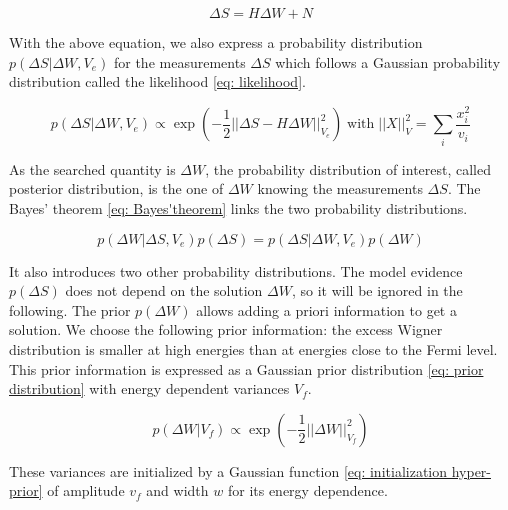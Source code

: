 \begin{equation}
\Delta S = H\Delta W + N \label{eq: matrix product for convolution}
\end{equation}

With the above equation, we also express a probability distribution $p\left(\Delta S \left|\right. \Delta W, V_{e} \right)$ for the measurements $\Delta S$ which follows a Gaussian probability distribution called the likelihood \eqref{eq: likelihood}.

\begin{equation}
p\left(\Delta S \left|\right. \Delta W, V_{e}  \right) \propto \exp\left(-\frac{1}{2}\left||\Delta S - H\Delta W\right||^{2}_{V_{e}}\right)\;\mathrm{with}\;\left||X\right||^{2}_{V} = \sum_{i}^{}\frac{x^{2}_{i}}{v_{i}} \label{eq: likelihood}
\end{equation}

As the searched quantity is $\Delta W$, the probability distribution of interest, called posterior distribution, is the one of $\Delta W$ knowing the measurements $\Delta S$.
The Bayes' theorem \eqref{eq: Bayes'theorem} links the two probability distributions.

\begin{equation}
p\left(\Delta W \left|\right. \Delta S, V_{e} \right) p\left(\Delta S\right) = p\left(\Delta S \left|\right. \Delta W, V_{e}  \right) p\left( \Delta W \right) \label{eq: Bayes'theorem}
\end{equation}

It also introduces two other probability distributions.
The model evidence $p\left(\Delta S\right)$ does not depend on the solution $\Delta W$, so it will be ignored in the following.
The prior $p\left( \Delta W \right)$ allows adding a priori information to get a solution.
We choose the following prior information: the excess Wigner distribution is smaller at high energies than at energies close to the Fermi level.
This prior information is expressed as a Gaussian prior distribution \eqref{eq: prior distribution} with energy dependent variances $V_{f}$.

\begin{equation}
p\left( \Delta W \left|\right. V_{f} \right) \propto \exp\left(-\frac{1}{2}\left||\Delta W\right||^{2}_{V_{f}}\right) \label{eq: prior distribution}
\end{equation}

These variances are initialized by a Gaussian function \eqref{eq: initialization hyper-prior} of amplitude $v_{f}$ and width $w$ for its energy dependence.

